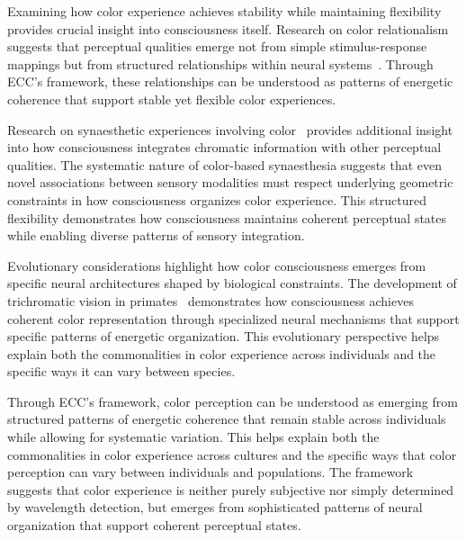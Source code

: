 Examining how color experience achieves stability while maintaining flexibility provides crucial insight into consciousness itself. Research on color relationalism suggests that perceptual qualities emerge not from simple stimulus-response mappings but from structured relationships within neural systems~\cite{ByrneHilbert2017, amil2024theta}. Through ECC's framework, these relationships can be understood as patterns of energetic coherence that support stable yet flexible color experiences.

Research on synaesthetic experiences involving color~\cite{HarrisonBaronCohen1997, van2025processes} provides additional insight into how consciousness integrates chromatic information with other perceptual qualities. The systematic nature of color-based synaesthesia suggests that even novel associations between sensory modalities must respect underlying geometric constraints in how consciousness organizes color experience. This structured flexibility demonstrates how consciousness maintains coherent perceptual states while enabling diverse patterns of sensory integration.

Evolutionary considerations highlight how color consciousness emerges from specific neural architectures shaped by biological constraints. The development of trichromatic vision in primates~\cite{Neitz2017, bosl2025dynamical} demonstrates how consciousness achieves coherent color representation through specialized neural mechanisms that support specific patterns of energetic organization. This evolutionary perspective helps explain both the commonalities in color experience across individuals and the specific ways it can vary between species.

Through ECC's framework, color perception can be understood as emerging from structured patterns of energetic coherence that remain stable across individuals while allowing for systematic variation. This helps explain both the commonalities in color experience across cultures and the specific ways that color perception can vary between individuals and populations. The framework suggests that color experience is neither purely subjective nor simply determined by wavelength detection, but emerges from sophisticated patterns of neural organization that support coherent perceptual states.

